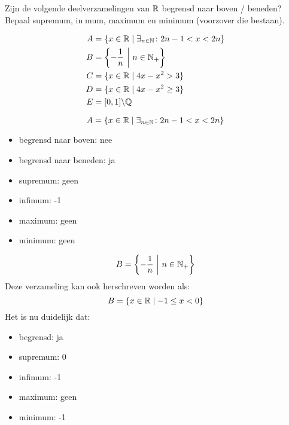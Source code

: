 \documentclass[week=1]{homework}
\date{\today}
\begin{document}
    \maketitle
    \thispagestyle{empty}
    \newpage
    \begin{questions}
		\let\firstquestion\question
		\renewcommand*{\question}{\vspace{7mm}\firstquestion}
        \firstquestion
        
        Zijn de volgende deelverzamelingen van $\mathbb{R}$ begrensd naar boven / beneden?
        Bepaal supremum, inmum, maximum en minimum (voorzover die bestaan).
        
        \begin{align*}
        	A &= \{ x \in \mathbb{R} \mid \exists_{n \in \mathbb{N}} \colon 2n-1 < x < 2n \} \\
        	B &= \left\{ - \frac{1}{n} \ \middle| \ n \in \mathbb{N}_+ \right\} \\
        	C &= \{ x \in \mathbb{R} \mid 4x - x^2 > 3 \} \\
        	D &= \{ x \in \mathbb{R} \mid 4x - x^2 \geq 3 \} \\
        	E &= [0,1]\backslash \mathbb{Q}
        \end{align*}
        
        \[
	        A = \{ x \in \mathbb{R} \mid \exists_{n \in \mathbb{N}} \colon 2n-1 < x < 2n \}
        \]
		      
		      \begin{itemize}
		      	\item begrensd naar boven: nee
		      	\item begrensd naar beneden: ja 
		      	\item supremum: geen
		      	\item infimum: -1
		      	\item maximum: geen
		      	\item minimum: geen
		      \end{itemize}
		              
        \[
	        B = \left\{ - \frac{1}{n} \ \middle| \ n \in \mathbb{N}_+ \right\}
        \]
        Deze verzameling kan ook herschreven worden als:
        \[
	        B = \{x \in \mathbb{R} \mid -1 \le x < 0 \}
        \]      
        Het is nu duidelijk dat:
              \begin{itemize}
              	\item begrensd: ja
              	\item supremum: 0
              	\item infimum: -1
              	\item maximum: geen
              	\item minimum: -1
              \end{itemize}
              

\end{questions}
\end{document}
